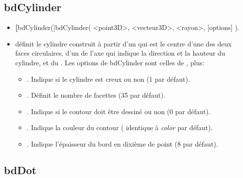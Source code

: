 \subsection{bdCylinder}
\begin{itemize}
 \item \util \textbf[bdCylinder(]{bdCylinder( <point3D>, <vecteur3D>, <rayon>, [options] )}.
 \item \desc définit le cylindre construit à partir d'un  qui est le centre d'une des deux faces circulaires, d'un  de l'axe qui indique la direction et la hauteur du cylindre, et du . Les options de bdCylinder sont celles de , plus:

  \begin{itemize}
   \item {}. Indique si le cylindre est creux ou non (1 par défaut).
   \item {}. Définit le nombre de facettes (35 par défaut).
   \item {}. Indique si le contour doit être dessiné ou non (0 par défaut).
   \item {}. Indique la couleur du contour ( identique à \textit{color} par défaut).
   \item {}. Indique l'épaisseur du bord en dixième de point ($8$ par défaut).   
  \end{itemize}
\end{itemize}

\subsection{bdDot}\label{macbdDot}

